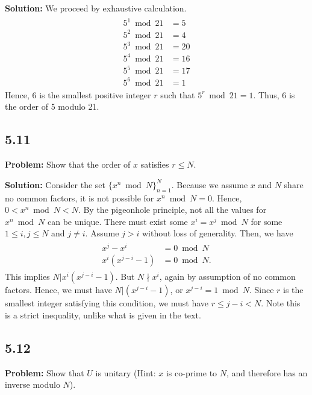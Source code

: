 \documentclass{article}
\begin{document}
\textbf{Solution:} We proceed by exhaustive calculation.
\begin{align}
\begin{aligned}
    5^1 \bmod 21 &= 5 \\
    5^2 \bmod 21 &= 4 \\
    5^3 \bmod 21 &= 20\\
    5^4 \bmod 21 &= 16\\
    5^5 \bmod 21 &= 17\\
    5^6 \bmod 21 &= 1
\end{aligned}
\end{align}
Hence, 6 is the smallest positive integer $r$ such that $5^r \bmod 21 = 1$. Thus, 6 is the order of 5 modulo 21.

\subsection*{5.11}
\textbf{Problem:} Show that the order of $x$ satisfies $r\leq N$.

\textbf{Solution:} Consider the set $\{x^n \bmod N\}_{n=1}^N$. Because we assume $x$ and $N$ share no common factors, it is not possible for $x^n \bmod N = 0$. Hence, $0< x^n \bmod N < N$. By the pigeonhole principle, not all the values for $x^n \bmod N$ can be unique. There must exist some $x^i = x^j \bmod N$ for some $1\leq i,j \leq N$ and $j\neq i$. Assume $j>i$ without loss of generality. Then, we have
\begin{align}
\begin{aligned}
    x^j-x^i &= 0 \bmod N \\
    x^i(x^{j-i}-1) &=0 \bmod N.
\end{aligned}
\end{align}
This implies $N|x^i(x^{j-i}-1)$. But $N\nmid x^i$, again by assumption of no common factors. Hence, we must have $N|(x^{j-i}-1)$, or $x^{j-i} = 1 \bmod N$. Since $r$ is the smallest integer satisfying this condition, we must have $r\leq j-i < N$. Note this is a strict inequality, unlike what is given in the text.

\subsection*{5.12}
\textbf{Problem:} Show that $U$ is unitary (Hint: $x$ is co-prime to $N$, and therefore has an inverse modulo $N$).
\end{document}
